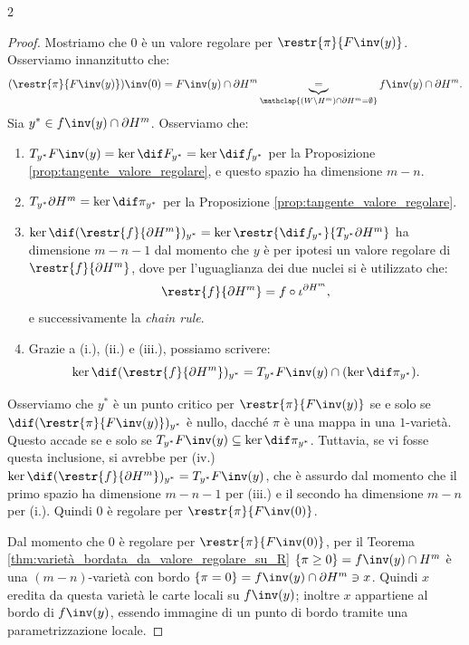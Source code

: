 \begin{multicols*}{2}
\begin{proof}
        Mostriamo che $0$ è un valore regolare per $\restr{\pi}{F\inv(y)}$. Osserviamo innanzitutto che:
        \[
            (\restr{\pi}{F\inv(y)})\inv(0) = F\inv(y) \cap \partial H^m \underbrace{=}_{\mathclap{(W \setminus H^m) \cap \partial H^m = \emptyset}} f\inv(y) \cap \partial H^m.
        \]
        Sia $y^* \in f\inv(y) \cap \partial H^m$. Osserviamo che:
        \begin{enumerate}[(i.)]
            \item $T_{y^*} F\inv(y) = \ker \dif F_{y^*} = \ker \dif f_{y^*}$ per la Proposizione \ref{prop:tangente_valore_regolare}, e questo spazio
                  ha dimensione $m-n$.
            \item $T_{y^*} \partial H^m = \ker \dif \pi_{y^*}$ per la Proposizione \ref{prop:tangente_valore_regolare}.
            \item $\ker \dif (\restr{f}{\partial H^m})_{y^*} = \ker \restr{\dif f_{y^*}}{T_{y^*} \partial H^m}$ ha dimensione
                  $m-n-1$ dal momento che $y$ è per ipotesi un valore regolare di $\restr{f}{\partial H^m}$, dove per l'uguaglianza
                  dei due nuclei si è utilizzato che:
                  \[
                      \restr{f}{\partial H^m} = f \circ \iota^{\partial H^m},
                  \]
                  e successivamente la \textit{chain rule}.
            \item Grazie a (i.), (ii.) e (iii.), possiamo scrivere:
                  \[
                      \ker \dif (\restr{f}{\partial H^m})_{y^*} = T_{y^*} F\inv(y) \cap (\ker \dif \pi_{y^*}).
                  \]
        \end{enumerate}

        Osserviamo che $y^*$ è un punto critico per $\restr{\pi}{F\inv(y)}$ se e solo se $\dif (\restr{\pi}{F\inv(y)})_{y^*}$ è nullo,
        dacché $\pi$ è una mappa in una $1$-varietà.
        Questo accade se e solo se $T_{y^*} F\inv(y) \subseteq \ker \dif \pi_{y^*}$. Tuttavia, se vi fosse questa inclusione, si avrebbe per (iv.)
        $\ker \dif (\restr{f}{\partial H^m})_{y^*} = T_{y^*} F\inv(y)$, che è assurdo dal momento che il primo spazio ha dimensione $m-n-1$ per (iii.)
        e il secondo ha dimensione $m-n$ per (i.). Quindi $0$ è regolare per $\restr{\pi}{F\inv(0)}$. \smallskip

        Dal momento che $0$ è regolare per $\restr{\pi}{F\inv(0)}$, per il Teorema \ref{thm:varietà_bordata_da_valore_regolare_su_R}
        $\{\pi \geq 0\} = f\inv(y) \cap H^m$ è una $(m-n)$-varietà con bordo $\{\pi = 0\} = f\inv(y) \cap \partial H^m \ni x$.
        Quindi $x$ eredita da questa varietà le carte locali su $f\inv(y)$; inoltre $x$ appartiene al bordo di $f\inv(y)$,
        essendo immagine di un punto di bordo tramite una parametrizzazione locale.
    \end{proof}


\end{multicols*}
